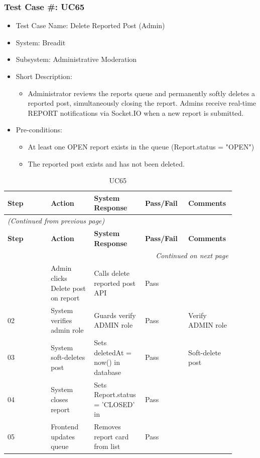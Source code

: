 \subsubsection{Test Case \#: UC65}
\begin{itemize}
  \item Test Case Name: Delete Reported Post (Admin)
  \item System: Breadit
  \item Subsystem: Administrative Moderation
  \item Short Description:
\begin{itemize}
  \item Administrator reviews the reports queue and permanently softly deletes a reported post, simultaneously closing the report. Admins receive real-time REPORT notifications via Socket.IO when a new report is submitted.
\end{itemize}
  \item Pre-conditions:
\begin{itemize}
  \item At least one OPEN report exists in the queue (Report.status = "OPEN")
  \item The reported post exists and has not been deleted.
\end{itemize}
\end{itemize}

\begin{longtable}{|p{0.18\linewidth}|p{0.18\linewidth}|p{0.18\linewidth}|p{0.18\linewidth}|p{0.18\linewidth}|}
\caption{UC65} \label{tab:44} \\
\hline
\textbf{Step} & \textbf{Action} & \textbf{System Response} & \textbf{Pass/Fail} & \textbf{Comments} \\
\hline
\endfirsthead
\multicolumn{5}{l}{\textit{(Continued from previous page)}} \\
\hline
\textbf{Step} & \textbf{Action} & \textbf{System Response} & \textbf{Pass/Fail} & \textbf{Comments} \\
\hline
\endhead
\hline \multicolumn{5}{r}{\textit{Continued on next page}} \\
\endfoot
\hline
\endlastfoot
01 & Admin clicks Delete post on report & Calls delete reported post API & Pass &  \\
\hline
02 & System verifies admin role & Guards verify ADMIN role & Pass & Verify ADMIN role \\
\hline
03 & System soft-deletes post & Sets deletedAt = now() in database & Pass & Soft-delete post \\
\hline
04 & System closes report & Sets Report.status = 'CLOSED' in & Pass &  \\
\hline
05 & Frontend updates queue & Removes report card from list & Pass &  \\
\hline
\end{longtable}

